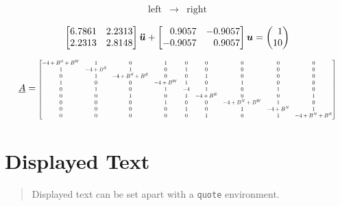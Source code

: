 \begin{equation*}
	\begin{array}{rcl}
		\text{left} & \longrightarrow & \text{right}
	\end{array}
	\tag{array}
	\label{eq:equations-array}
\end{equation*}

\begin{equation}
	\label{eq:equations-matrix-system}
	\begin{bmatrix*}[r]
		6.7861 & 2.2313 \\
		2.2313 & 2.8148
	\end{bmatrix*}
	\vect{\ddot{u}}
	+
	\begin{bmatrix*}[r]
		 0.9057 & -0.9057 \\
		-0.9057 &  0.9057
	\end{bmatrix*}
	\vect{u}
	=
	\begin{pmatrix*}[r]
		1 \\
		10
	\end{pmatrix*}
\end{equation}

\begin{equation}
	\label{eq:equations-wide-matrix}
	\underline{A} =
	\resizebox{.90\hsize}{!}{$
	\begin{bmatrix*}[c]
		-4+B^S+B^W & 1 & 0 & 1 & 0 & 0 & 0 & 0 & 0 \\
		1 & -4+B^S & 1 & 0 & 1 & 0 & 0 & 0 & 0 \\
		0 & 1 & -4+B^S+B^E & 0 & 0 & 1 & 0 & 0 & 0 \\
		1 & 0 & 0 & -4+B^W & 1 & 0 & 1 & 0 & 0 \\
		0 & 1 & 0 & 1 & -4 & 1 & 0 & 1 & 0 \\
		0 & 0 & 1 & 0 & 1 & -4+B^E & 0 & 0 & 1 \\
		0 & 0 & 0 & 1 & 0 & 0 & -4+B^N+B^W & 1 & 0 \\
		0 & 0 & 0 & 0 & 1 & 0 & 1 & -4+B^N & 1 \\
		0 & 0 & 0 & 0 & 0 & 1 & 0 & 1 & -4+B^N+B^E
	\end{bmatrix*}
	$}
\end{equation}

\section{Displayed Text}
\label{sec:equations-displayed-text}

\begin{quote}
	\centering
	Displayed text can be set apart with a \texttt{quote} environment.
\end{quote}

